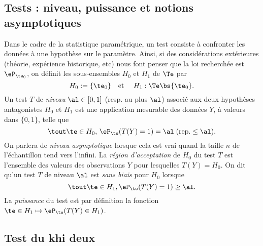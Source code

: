 %
\subsection{Tests : niveau, puissance et notions asymptotiques}
%

Dans le cadre de la statistique paramétrique, un test consiste à confronter
les données à une hypothèse sur le paramètre. Ainsi, si des considérations
extérieures (théorie, expérience historique, etc) nous font penser que la loi
recherchée est $\eP_{\te_0}$, on définit les sous-ensembles $H_0$ et $H_1$ de
$\Te$ par
$$
H_0:=\{\te_0\}
\text{\quad et \quad}
H_1: \Te\bs\{\te_0\}.
$$
Un test $T$ de \emph{niveau} $\al\in[0,1]$ (resp. au plus $\al$) associé aux
deux hypothèses antagonistes $H_0$ et $H_1$ est une application mesurable des
données $Y$, à valeurs dans $\{0,1\}$, telle que
$$
\tout\te\in H_0,\,\eP_\te(T(Y)=1) = \al\; (\text{rep.} \leq \al).
$$
On parlera de \emph{niveau asymptotique} lorsque cela est vrai quand la
taille $n$ de l'échantillon tend vers l'infini. La \emph{région d'acceptation}
de $H_0$ du test $T$ est l'ensemble des valeurs des observations $Y$ pour
lesquelles $T(Y)=H_0$. On dit qu'un test $T$ de niveau $\al$ est \emph{sans
  biais} pour $H_0$ lorsque
$$
\tout\te\in H_1, \eP_\te(T(Y)=1) \geq \al.
$$
La \emph{puissance} du test est par définition la fonction $\te\in H_1
\mapsto \eP_\te(T(Y)\in H_1)$.


%
\subsection{Test du khi deux}
\label{ss:test-chideux}
%

